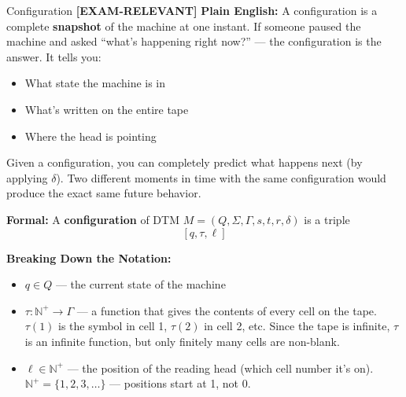 \documentclass[11pt,a4paper]{article}
\newcommand{\kemark}{\textcolor{red!70!black}{\textbf{[EXAM-RELEVANT]}}}
\begin{document}
\begin{definitionbox}{Configuration \kemark}
\textbf{Plain English:} A configuration is a complete \textbf{snapshot} of the machine at one instant. If someone paused the machine and asked ``what's happening right now?'' --- the configuration is the answer. It tells you:
\begin{itemize}[nosep]
\item What state the machine is in
\item What's written on the entire tape
\item Where the head is pointing
\end{itemize}

Given a configuration, you can completely predict what happens next (by applying $\delta$). Two different moments in time with the same configuration would produce the exact same future behavior.

\textbf{Formal:} A \textbf{configuration} of DTM $M = (Q, \Sigma, \Gamma, s, t, r, \delta)$ is a triple
$$[q, \tau, \ell]$$

\textbf{Breaking Down the Notation:}
\begin{itemize}
\item $q \in Q$ --- the current state of the machine
\item $\tau\colon \mathbb{N}^+ \to \Gamma$ --- a function that gives the contents of every cell on the tape. $\tau(1)$ is the symbol in cell 1, $\tau(2)$ in cell 2, etc. Since the tape is infinite, $\tau$ is an infinite function, but only finitely many cells are non-blank.
\item $\ell \in \mathbb{N}^+$ --- the position of the reading head (which cell number it's on). $\mathbb{N}^+ = \{1, 2, 3, \ldots\}$ --- positions start at 1, not 0.
\end{itemize}
\end{definitionbox}
\end{document}
